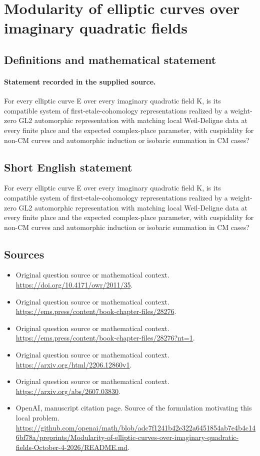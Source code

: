 \documentclass[11pt]{article}
\begin{document}
\section*{Modularity of elliptic curves over imaginary quadratic fields}\label{statement}
\subsection{Definitions and mathematical statement}
\paragraph{Statement recorded in the supplied source.}
For every elliptic curve E over every imaginary quadratic field K, is its compatible system of first-etale-cohomology representations realized by a weight-zero GL2 automorphic representation with matching local Weil-Deligne data at every finite place and the expected complex-place parameter, with cuspidality for non-CM curves and automorphic induction or isobaric summation in CM cases?
\subsection{Short English statement}
For every elliptic curve E over every imaginary quadratic field K, is its compatible system of first-etale-cohomology representations realized by a weight-zero GL2 automorphic representation with matching local Weil-Deligne data at every finite place and the expected complex-place parameter, with cuspidality for non-CM curves and automorphic induction or isobaric summation in CM cases?
\subsection{Sources}
\begin{itemize}
\item[S1] Original question source or mathematical context.
\url{https://doi.org/10.4171/owr/2011/35}.
\item[S2] Original question source or mathematical context.
\url{https://ems.press/content/book-chapter-files/28276}.
\item[S3] Original question source or mathematical context.
\url{https://ems.press/content/book-chapter-files/28276?nt=1}.
\item[S4] Original question source or mathematical context.
\url{https://arxiv.org/html/2206.12860v1}.
\item[S5] Original question source or mathematical context.
\url{https://arxiv.org/abs/2607.03830}.
\item[S6] OpenAI, manuscript citation page. Source of the formulation motivating this local problem.
\url{https://github.com/openai/math/blob/adc7f1241b42e322a6451854ab7e4b4c146bf78a/preprints/Modularity-of-elliptic-curves-over-imaginary-quadratic-fields-October-4-2026/README.md}.
\end{itemize}
\end{document}
